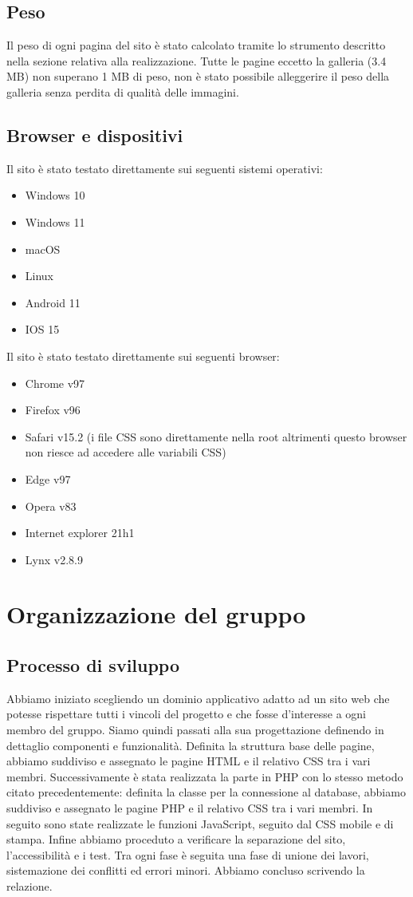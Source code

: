 \documentclass[a4paper]{article}
\begin{document}
	\subsection{Peso}
	Il peso di ogni pagina del sito è stato calcolato tramite lo strumento descritto nella sezione relativa alla realizzazione. Tutte le pagine eccetto la galleria (3.4 MB) non superano 1 MB di peso, non è stato possibile alleggerire il peso della galleria senza perdita di qualità delle immagini.
	
	\subsection{Browser e dispositivi}
	Il sito è stato testato direttamente sui seguenti sistemi operativi:
	\begin{itemize}
		\item Windows 10
		\item Windows 11
		\item macOS
		\item Linux
		\item Android 11
		\item IOS 15
	\end{itemize}
	Il sito è stato testato direttamente sui seguenti browser:
	\begin{itemize}
		\item Chrome v97
		\item Firefox v96
		\item Safari v15.2 (i file CSS sono direttamente nella root altrimenti questo browser non riesce ad accedere alle variabili CSS)
		\item Edge v97
		\item Opera v83
		\item Internet explorer 21h1
		\item Lynx v2.8.9
	\end{itemize}   

	\section{Organizzazione del gruppo}
	\subsection{Processo di sviluppo}
	Abbiamo iniziato scegliendo un dominio applicativo adatto ad un sito web che potesse rispettare tutti i vincoli del progetto e che fosse d'interesse a ogni membro del gruppo. Siamo quindi passati alla sua progettazione definendo in dettaglio componenti e funzionalità. Definita la struttura base delle pagine, abbiamo suddiviso e assegnato le pagine HTML e il relativo CSS tra i vari membri. Successivamente è stata realizzata la parte in PHP con lo stesso metodo citato precedentemente: definita la classe per la connessione al database, abbiamo suddiviso e assegnato le pagine PHP e il relativo CSS tra i vari membri. In seguito sono state realizzate le funzioni JavaScript, seguito dal CSS mobile e di stampa. Infine abbiamo proceduto a verificare la separazione del sito, l'accessibilità e i test. Tra ogni fase è seguita una fase di unione dei lavori, sistemazione dei conflitti ed errori minori. Abbiamo concluso scrivendo la relazione.
	
\end{document}
